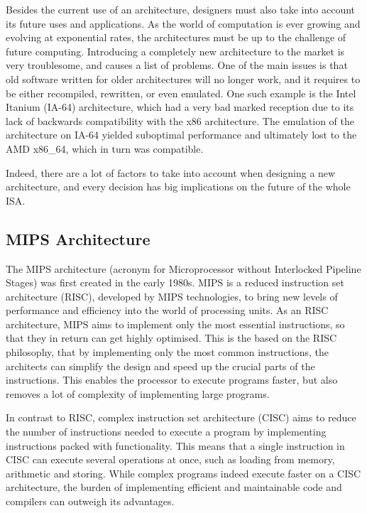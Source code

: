 Besides the current use of an architecture, designers must also take into
account its future uses and applications. As the world of computation is ever
growing and evolving at exponential rates, the architectures must be up to the
challenge of future computing. Introducing a completely new architecture to
the market is very troublesome, and causes a list of problems.
One of the main issues is that old software written for older architectures
will no longer work, and it requires to be either recompiled, rewritten,
or even emulated. One such example is the Intel Itanium (IA-64) architecture,
which had a very bad marked reception due to its lack of backwards
compatibility
with the x86 architecture. The emulation of the architecture on IA-64 yielded
suboptimal performance and ultimately lost to the AMD x86\_64, which in
turn was
compatible.\cite{anandtech:1854}

Indeed, there are a lot of factors to take into account when designing a new
architecture, and every decision has big implications on the future of the
whole ISA.

\subsection{MIPS Architecture}
The MIPS architecture (acronym for Microprocessor without Interlocked Pipeline
Stages) was first created in the early 1980s.\cite{imgtec:MIPS_Overview}
MIPS is a reduced instruction set architecture (RISC), developed by MIPS
technologies, to bring new levels of
performance and efficiency into the world of processing units. As an RISC
architecture, MIPS aims to implement only the most essential instructions, so
that they in return can get highly optimised. This is the based on the RISC
philosophy, that by implementing only the most common instructions, the
architects can simplify the design and speed up the crucial parts of the
instructions. This enables the processor to execute programs faster, but also
removes a lot of complexity of implementing large programs.

In contrast to RISC, complex instruction set architecture (CISC) aims
to reduce the number of instructions needed to execute a program by
implementing instructions packed with functionality. This means that a single
instruction in CISC can execute several operations at once, such as loading
from memory, arithmetic
and storing. While complex programs indeed execute faster on a CISC
architecture,
the burden of implementing efficient and maintainable code and compilers can
outweigh its advantages. \cite{Patterson:1980:CRI:641914.641917}

